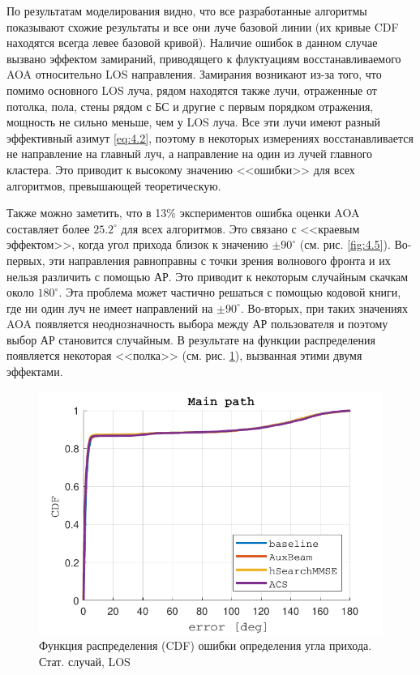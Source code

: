 По результатам моделирования видно, что все разработанные алгоритмы показывают 
схожие результаты и все они луче базовой линии (их кривые CDF находятся всегда
левее базовой кривой). Наличие ошибок в данном случае вызвано эффектом
замираний, приводящего к флуктуациям восстанавливаемого AOA относительно LOS
направления.  Замирания возникают из-за того, что помимо основного LOS луча,
рядом находятся также лучи, отраженные от потолка, пола, стены рядом с БС и
другие с первым порядком отражения, мощность не сильно меньше, чем у LOS луча.
Все эти лучи имеют разный эффективный азимут \eqref{eq:4.2}, поэтому в некоторых
измерениях восстанавливается не направление на главный луч, а направление на
один из лучей главного кластера. Это приводит к высокому значению <<ошибки>> 
для всех алгоритмов, превышающей теоретическую.

Также можно заметить, что в 13\% экспериментов ошибка оценки AOA составляет
более $25.2^\circ$ для всех алгоритмов. Это связано с <<краевым эффектом>>,
когда угол прихода близок к значению $\pm 90^\circ$ (см. рис. \ref{fig:4.5}).
Во-первых, эти направления равноправны с точки зрения волнового фронта и их
нельзя различить с помощью АР.  Это приводит к некоторым случайным скачкам около
$180^\circ$. Эта проблема может частично решаться с помощью кодовой книги, где
ни один луч не имеет направлений на $\pm 90^\circ$.  Во-вторых, при таких
значениях AOA появляется неоднозначность выбора между АР пользователя и поэтому
выбор АР становится случайным. В результате на функции распределения появляется 
некоторая <<полка>> (см. рис. \ref{fig:singlepath:static:LOSa}), вызванная этими
двумя эффектами.
\begin{figure}[ht]
  \centering
  \includegraphics{results/rus/singlepath-static-LOS-full-1}
  \caption{Функция распределения (CDF) ошибки определения угла прихода. Стат. случай, LOS}
  \label{fig:singlepath:static:LOSa}
\end{figure}

